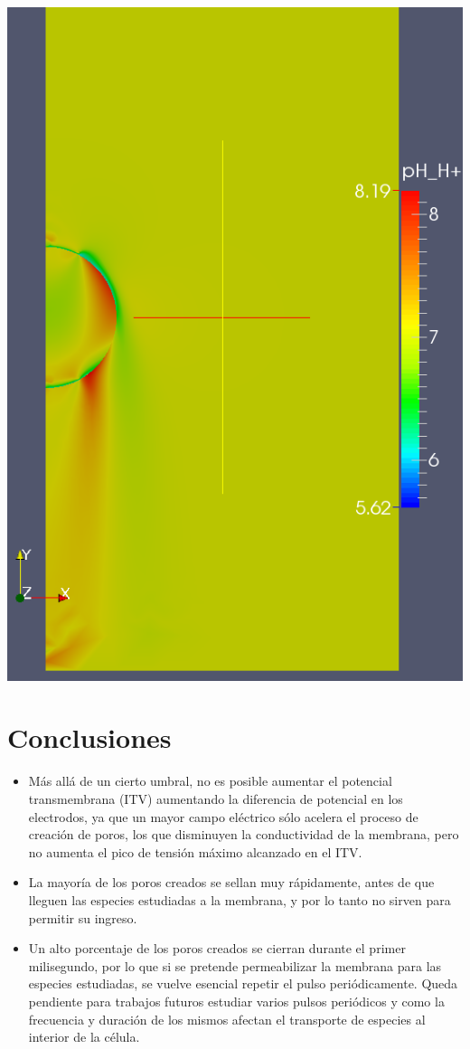 \documentclass[11pt, twocolumn]{article}
\begin{document}
\begin{center}
	\includegraphics[width=0.52\linewidth]{H-ejemplo}
\end{center}


\section{Conclusiones}

\begin{itemize}
	\item Más allá de un cierto umbral, no es posible aumentar el potencial transmembrana (ITV) aumentando la diferencia de potencial en los electrodos, ya que un mayor campo eléctrico sólo acelera el proceso de creación de poros, los que disminuyen la conductividad de la membrana, pero no aumenta el pico de tensión máximo alcanzado en el ITV.
	\item La mayoría de los poros creados se sellan muy rápidamente, antes de que lleguen las especies estudiadas a la membrana, y por lo tanto no sirven para permitir su ingreso.
	\item Un alto porcentaje de los poros creados se cierran durante el primer milisegundo, por lo que si se pretende permeabilizar la membrana para las especies estudiadas, se vuelve esencial repetir el pulso periódicamente. Queda pendiente para trabajos futuros estudiar varios pulsos periódicos y como la frecuencia y duración de los mismos afectan el transporte de especies al interior de la célula. 
\end{itemize}
\end{document}
